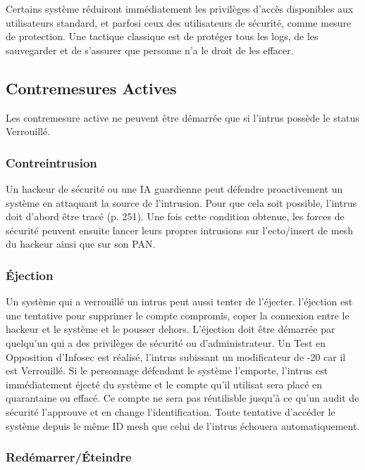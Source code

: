 Certains système réduiront immédiatement les privilèges d'accès disponibles aux utilisateurs standard, et parfosi ceux des utilisateurs de sécurité, comme mesure de protection. Une tactique classique est de protéger tous les logs, de les sauvegarder et de s'assurer que personne n'a le droit de les effacer. 

\subsection{Contremesures Actives} 

Les contremesure active ne peuvent être démarrée que si l'intrus possède le status Verrouillé. 

\subsubsection{Contreintrusion} 

Un hackeur de sécurité ou une IA guardienne peut défendre proactivement un système en attaquant la source de l'intrusion. Pour que cela soit possible, l'intrus doit d'abord être tracé (p. 251). Une fois cette condition obtenue, les forces de sécurité peuvent ensuite lancer leurs propres intrusions sur l'ecto/insert de mesh du hackeur ainsi que sur son PAN. 

\subsubsection{Éjection} 

Un système qui a verrouillé un intrus peut aussi tenter de l'éjecter. l'éjection est une tentative pour supprimer le compte compromis, coper la connexion entre le hackeur et le système et le pousser dehors. L'éjection doit être démarrée par quelqu'un qui a des privilèges de sécurité ou d'administrateur. Un Test en Opposition d'Infosec est réalisé, l'intrus subissant un modificateur de -20 car il est Verrouillé. Si le personnage défendant le système l'emporte, l'intrus est immédiatement éjecté du système et le compte qu'il utilisat sera placé en quarantaine ou effacé. Ce compte ne sera pas réutilisble jusqu'à ce qu'un audit de sécurité l'approuve et en change l'identification. Toute tentative d'accéder le système depuis le même ID mesh que celui de l'intrus échouera automatiquement. 

\subsubsection{Redémarrer/Éteindre} 

